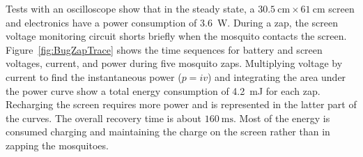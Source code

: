 Tests with an oscilloscope show that in the steady state, a $\SI{30.5}{\centi\metre} \times \SI{61}{\centi\metre}$ screen and electronics have a power consumption of \SI{3.6}{\watt}.  During a zap, the screen voltage monitoring circuit shorts briefly when the mosquito contacts the screen.  Figure~\ref{fig:BugZapTrace} shows the time sequences for battery and screen voltages, current, and power during five mosquito zaps.  
Multiplying voltage by current to find the instantaneous power ($p=iv$) and integrating the area under the power curve show a total energy consumption of \SI{4.2}{\milli\joule} for each zap.  Recharging the screen requires more power and is represented in the latter part of the curves.  The overall recovery time is about $\SI{160}{\milli\second}$.  Most of the energy is consumed charging and maintaining the charge on the screen rather than in zapping the mosquitoes.





%
%    
